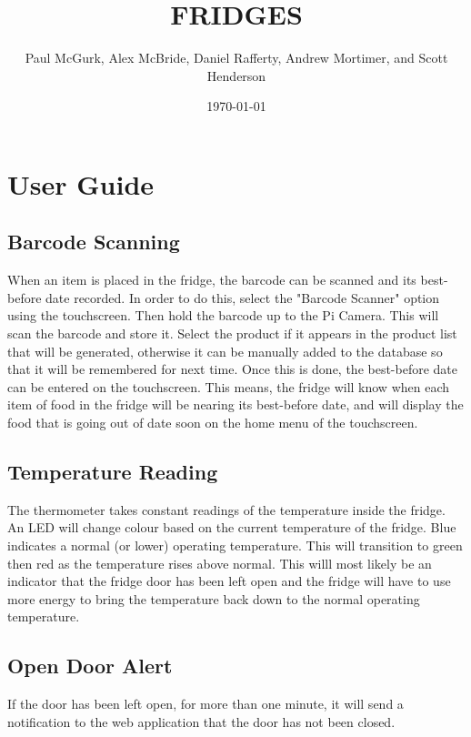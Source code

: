 \documentclass[10pt]{article}
\title{FRIDGES}
\author{Paul McGurk, Alex McBride, Daniel Rafferty, Andrew Mortimer, and Scott Henderson}
\date{\today}
\begin{document}
\begin{titlepage}
\maketitle
\end{titlepage}

\linespread{1.15} %
\renewcommand{\arraystretch}{1.2} %

\tableofcontents

\newpage
\section{User Guide}
\subsection{Barcode Scanning}
When an item is placed in the fridge, the barcode can be scanned and its best-before date recorded. In order to do this, select the "Barcode Scanner" option using the touchscreen. Then hold the barcode up to the Pi Camera. This will scan the barcode and store it. Select the product if it appears in the product list that will be generated, otherwise it can be manually added to the database so that it will be remembered  for next time. Once this is done, the best-before date can be entered on the touchscreen. This means, the fridge will know when each item of food in the fridge will be nearing its best-before date, and will display the food that is going out of date soon on the home menu of the touchscreen.
\subsection{Temperature Reading}
The thermometer takes constant readings of the temperature inside the fridge. An LED will change colour based on the current temperature of the fridge. Blue indicates a normal (or lower) operating temperature. This will transition to green then red as the temperature rises above normal. This willl most likely be an indicator that the fridge door has been left open and the fridge will have to use more energy to bring the temperature back down to the normal operating temperature.
\subsection{Open Door Alert}
If the door has been left open, for more than one minute, it will send a notification to the web application that the door has not been closed.
\end{document}
